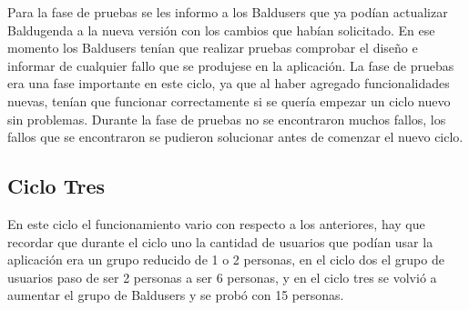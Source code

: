 Para la fase de pruebas se les informo a los Baldusers que ya podían actualizar Baldugenda a la nueva versión con los cambios que habían solicitado. En ese momento los Baldusers tenían que realizar pruebas comprobar el diseño e informar de  cualquier fallo que se produjese en la aplicación. La fase de pruebas era una fase importante en este ciclo, ya que al haber agregado funcionalidades nuevas, tenían que funcionar correctamente si se quería empezar un ciclo nuevo sin problemas. Durante la fase de pruebas no se encontraron muchos fallos, los fallos que se encontraron se pudieron solucionar antes de comenzar el nuevo ciclo.

\subsection{Ciclo Tres}
\label{subsecc:ciclo Tres}

En este ciclo el funcionamiento vario con respecto a los anteriores, hay que recordar que durante el ciclo uno la cantidad de usuarios que podían usar la aplicación era un grupo reducido de 1 o 2 personas, en el ciclo dos el grupo de usuarios paso de ser 2 personas a ser 6 personas, y en el ciclo tres se volvió a aumentar el grupo de Baldusers y se probó con 15 personas.

